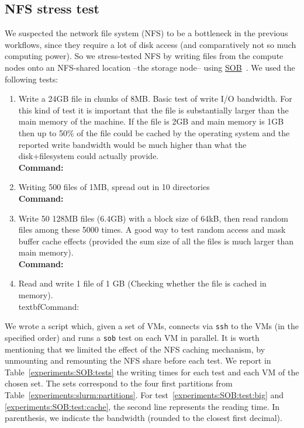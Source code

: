 \subsection{NFS stress test}
\label{experiments:NFS}

We suspected the network file system (NFS) to be a bottleneck in the
previous workflows, since they require a lot of disk access (and
comparatively not so much computing power). So we stress-tested NFS by
writing files from the compute nodes onto an NFS-shared location --the
storage node-- using
\href{https://www.pdc.kth.se/~pek/sob}{SOB}~\cite{sob}.
%
We used the following tests:

\begin{enumerate}
%
\item \label{experiments:SOB:test:big}%
Write a 24GB file in chunks of 8MB. Basic test of write I/O bandwidth.
For this kind of test it is important that the file is substantially
larger than the main memory of the machine. If the file is 2GB and main
memory is 1GB then up to 50\% of the file could be cached by the
operating system and the reported write bandwidth would be much higher
than what the disk+filesystem could actually provide.
%
\\\textbf{Command:}\ 
%
\item Writing 500 files of 1MB, spread out in 10 directories
%
\\\textbf{Command:}\ 
%
\item Write 50 128MB files (6.4GB) with a block size of 64kB, then read random
files among these 5000 times. A good way to test random access and mask
buffer cache effects (provided the sum size of all the files is much
larger than main memory).
%
\\\textbf{Command:}\ 
%
\item  \label{experiments:SOB:test:cache}%
 Read and write 1 file of 1 GB (Checking whether the file is cached in memory).
%
\\textbf{Command:}\ 
%
\end{enumerate}

We wrote a script which, given a set of VMs, connects via \texttt{ssh}
to the VMs (in the specified order) and runs a \texttt{sob} test on
each VM in parallel.
%
It is worth mentioning that we limited the effect of the NFS caching
mechanism, by unmounting and remounting the NFS share before each
test.
%
We report in Table~\ref{experiments:SOB:tests} the writing times for
each test and each VM of the chosen set. The sets correspond to the
four first partitions from
Table~\ref{experiments:slurm:partitions}. For
test~\ref{experiments:SOB:test:big} and
\ref{experiments:SOB:test:cache}, the second line represents the
reading time. In parenthesis, we indicate the bandwidth (rounded to
the closest first decimal).

